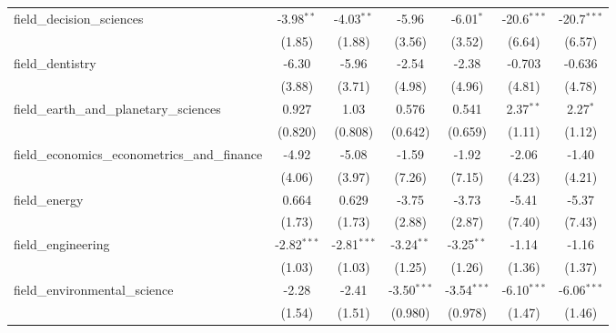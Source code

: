 \begin{tabular}{lcccccc}
   field\_decision\_sciences                                   & -3.98$^{**}$  & -4.03$^{**}$  & -5.96         & -6.01$^{*}$   & -20.6$^{***}$ & -20.7$^{***}$\\   
                                                               & (1.85)        & (1.88)        & (3.56)        & (3.52)        & (6.64)        & (6.57)\\   
   field\_dentistry                                            & -6.30         & -5.96         & -2.54         & -2.38         & -0.703        & -0.636\\   
                                                               & (3.88)        & (3.71)        & (4.98)        & (4.96)        & (4.81)        & (4.78)\\   
   field\_earth\_and\_planetary\_sciences                      & 0.927         & 1.03          & 0.576         & 0.541         & 2.37$^{**}$   & 2.27$^{*}$\\   
                                                               & (0.820)       & (0.808)       & (0.642)       & (0.659)       & (1.11)        & (1.12)\\   
   field\_economics\_econometrics\_and\_finance                & -4.92         & -5.08         & -1.59         & -1.92         & -2.06         & -1.40\\   
                                                               & (4.06)        & (3.97)        & (7.26)        & (7.15)        & (4.23)        & (4.21)\\   
   field\_energy                                               & 0.664         & 0.629         & -3.75         & -3.73         & -5.41         & -5.37\\   
                                                               & (1.73)        & (1.73)        & (2.88)        & (2.87)        & (7.40)        & (7.43)\\   
   field\_engineering                                          & -2.82$^{***}$ & -2.81$^{***}$ & -3.24$^{**}$  & -3.25$^{**}$  & -1.14         & -1.16\\   
                                                               & (1.03)        & (1.03)        & (1.25)        & (1.26)        & (1.36)        & (1.37)\\   
   field\_environmental\_science                               & -2.28         & -2.41         & -3.50$^{***}$ & -3.54$^{***}$ & -6.10$^{***}$ & -6.06$^{***}$\\   
                                                               & (1.54)        & (1.51)        & (0.980)       & (0.978)       & (1.47)        & (1.46)\\   

\end{tabular}
